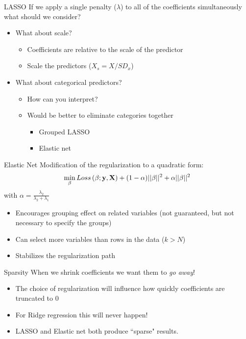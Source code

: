 \documentclass{beamer}\usepackage[]{graphicx}\usepackage[]{color}
\begin{document}
\begin{frame}{LASSO}
If we apply a single penalty ($\lambda$) to all of the coefficients simultaneously what should we consider?\\
\pause
\bigskip
\begin{itemize}
\item What about scale?
\pause
  \begin{itemize}
  \item Coefficients are relative to the scale of the predictor
  \item Scale the predictors ($X_s = X/SD_x$)
  \end{itemize}
\bigskip
\pause
\item What about categorical predictors?
\pause
  \begin{itemize}
  \item How can you interpret?
  \item Would be better to eliminate categories together
  \pause
    \begin{itemize}
    \item Grouped LASSO
    \item Elastic net
    \end{itemize}  
  \end{itemize}
\end{itemize}
\end{frame}

\begin{frame}{Elastic Net}
Modification of the regularization to a quadratic form:
$$\min_\beta Loss\left(\beta; \bf{y,X} \right) + (1-\alpha) ||\beta||^2 + \alpha ||\beta||^2$$
with $\alpha = \frac{\lambda_2}{\lambda_2 + \lambda_1}$
\begin{itemize}
\item Encourages grouping effect on related variables (not guaranteed, but not necessary to specify the groups)
\item Can select more variables than rows in the data ($k>N$)
\item Stabilizes the regularization path
\end{itemize}
\end{frame}

\begin{frame}{Sparsity}
When we shrink coefficients we want them to \emph{go away}!
\bigskip
\pause
\begin{itemize}
\item The choice of regularization will influence how quickly coefficients are truncated to 0
\item For Ridge regression this will never happen!
\item LASSO and Elastic net both produce ``sparse" results.
\end{itemize}
\end{frame}
\end{document}
